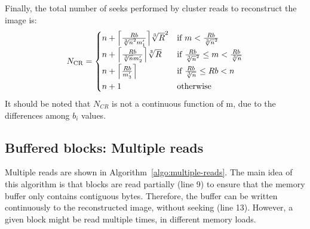 \documentclass[10pt, conference, compsocconf]{IEEEtran}
\DeclarePairedDelimiter{\ceil}{\lceil}{\rceil}
\begin{document}
Finally, the total number of seeks
performed by cluster reads to reconstruct the image is:
\begin{equation}
N_\mathrm{CR} =
\begin{cases}
  n + \ceil*{\frac{Rb}{\sqrt[3]{n}^2m_1'}}\sqrt[3]{R}^2     & \text{if } m < \frac{Rb}{\sqrt[3]{n}^2}\\[0.4em]
  n + \ceil*{\frac{Rb}{\sqrt[3]{n}m_2'}}\sqrt[3]{R}        & \text{if } \frac{Rb}{\sqrt[3]{n}^2} \leq m < \frac{Rb}{\sqrt[3]{n}}\\[0.4em]
  n + \ceil*{\frac{Rb}{m_3'}}                              & \text{if } \frac{Rb}{\sqrt[3]{n}} \leq Rb < n\\[0.4em]
  n + 1                                                          & \text{otherwise}
\end{cases} \label{eq:seeks-cluster-reads-1}
\end{equation}
It should be noted that $N_{CR}$ is not a continuous function of m,
due to the differences among $b_i$ values.


   
\subsection{Buffered blocks: Multiple reads}

Multiple reads are shown in Algorithm~\ref{algo:multiple-reads}.  The
main idea of this algorithm is that blocks are read partially (line 9)
to ensure that the memory buffer only contains contiguous
bytes. Therefore, the buffer can be written continuously to the
reconstructed image, without seeking (line 13).  However, a given
block might be read multiple times, in different memory loads.
\end{document}

